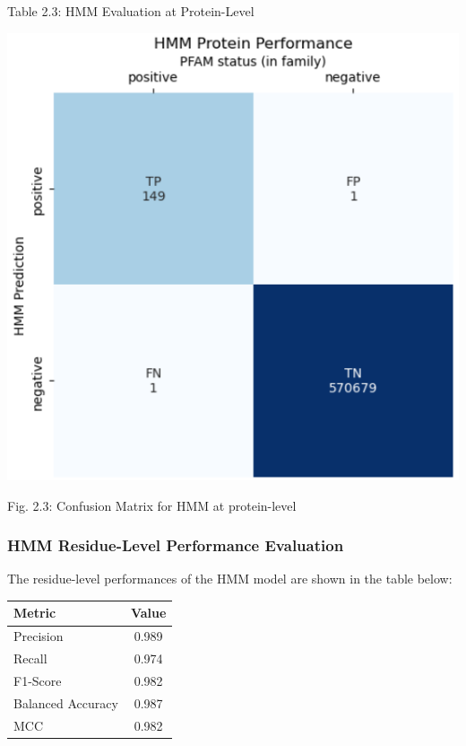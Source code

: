 \documentclass[10pt,twocolumn,letterpaper]{article}
\begin{document}
\begin{center}
    \small{Table 2.3: HMM Evaluation at Protein-Level}
\end{center}

\begin{center}
    \includegraphics[scale=0.45]{report/img/hmm_prot_performance.png}
\end{center}

\begin{center}
    \small{Fig. 2.3: Confusion Matrix for HMM at protein-level}
\end{center}

\subsubsection{HMM Residue-Level Performance Evaluation}

The residue-level performances of the HMM model are shown in the table below:

\begin{center}
    \begin{tabular}{lc}
        \toprule
        Metric & Value \\
        \midrule
        Precision & 0.989 \\
        Recall & 0.974 \\
        F1-Score & 0.982 \\
        Balanced Accuracy & 0.987 \\
        MCC & 0.982 \\
        \bottomrule
    \end{tabular}
\end{center} \\
\end{document}
